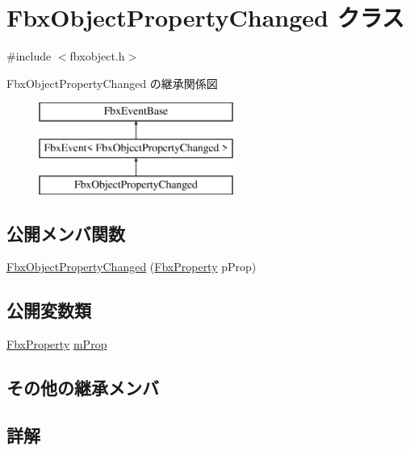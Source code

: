 \hypertarget{class_fbx_object_property_changed}{}\section{Fbx\+Object\+Property\+Changed クラス}
\label{class_fbx_object_property_changed}


{\ttfamily \#include $<$fbxobject.\+h$>$}

Fbx\+Object\+Property\+Changed の継承関係図\begin{figure}[H]
\begin{center}
\leavevmode
\includegraphics[height=3.000000cm]{class_fbx_object_property_changed}
\end{center}
\end{figure}
\subsection*{公開メンバ関数}
\begin{DoxyCompactItemize}
\item 
\hyperlink{class_fbx_object_property_changed_a48bdf8b5f7fb7f5e0b2a87cc00f9876b}{Fbx\+Object\+Property\+Changed} (\hyperlink{class_fbx_property}{Fbx\+Property} p\+Prop)
\end{DoxyCompactItemize}
\subsection*{公開変数類}
\begin{DoxyCompactItemize}
\item 
\hyperlink{class_fbx_property}{Fbx\+Property} \hyperlink{class_fbx_object_property_changed_a941055bc705ac87af79a63c46fb7a5a0}{m\+Prop}
\end{DoxyCompactItemize}
\subsection*{その他の継承メンバ}


\subsection{詳解}


